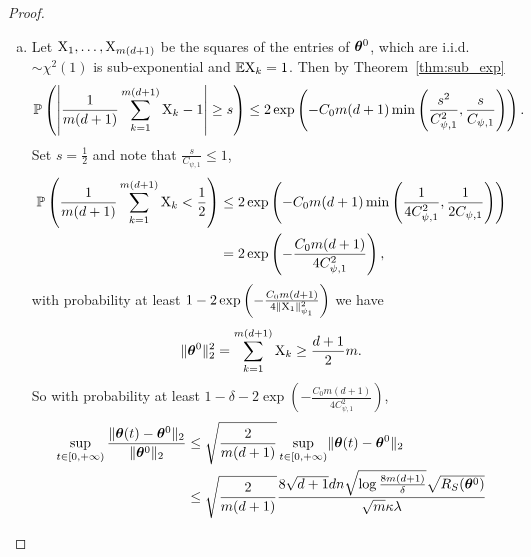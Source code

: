 \documentclass{article}
\begin{document}
\begin{proof}
\begin{enumerate}[(a)]
\begin{enumerate}[(i)]
\begin{equation}
                        \end{equation}
                        Suppose that $t^*_a<+\infty$ then one can take the limit $t\to t^*_a$ in~\eqref{thm-proof:w-step1}. This will lead to a contradiction with the definition of $t^*$. Therefore $t^*_a=+\infty$.
              \end{enumerate}
        \item Let $\textnormal{X}_1, \ldots, \textnormal{X}_{m(d+1)}$ be the squares of the entries of $\bm{\theta}^0$, which are i.i.d. $\sim\chi^2(1)$ is sub-exponential and $\mathbb{E}\textnormal{X}_k=1$. Then by Theorem~\ref{thm:sub_exp}
              \begin{equation}
                  \mathbb{P}\left(\left\lvert\frac{1}{m(d+1)}\sum_{k=1}^{m(d+1)}\textnormal{X}_k-1\right\rvert\geq s\right)\leq 2\exp\left(-C_0 m(d+1) \min\left(\frac{s^2}{C^2_{\psi,1}},\frac{s}{C_{\psi,1}}\right)\right).
              \end{equation}
              Set $s=\frac{1}{2}$ and note that $\frac{s}{C_{\psi,1}}\leq 1$,
              \begin{equation}
                  \begin{aligned}
                      \mathbb{P}\left(\frac{1}{m(d+1)}\sum_{k=1}^{m(d+1)}\textnormal{X}_k<\frac{1}{2}\right)
                       & \leq 2\exp\left(-C_0 m(d+1) \min\left(\frac{1}{4C^2_{\psi,1}},\frac{1}{2C_{\psi,1}}\right)\right) \\
                       & =2\exp\left(-\frac{C_0m(d+1)}{4C^2_{\psi,1}}\right),
                  \end{aligned}
              \end{equation}
              with probability at least $1-2\exp\left(-\frac{C_0m(d+1)}{4\lVert\textnormal{X}_1\rVert^2_{\psi_1}}\right)$ we have
              \begin{equation}
                  \lVert\bm{\theta}^0\rVert^2_2=\sum_{k=1}^{m(d+1)}\textnormal{X}_k\geq\frac{d+1}{2}m.
              \end{equation}
              So with probability at least $1-\delta-2\exp\left(-\frac{C_0m(d+1)}{4C^2_{\psi,1}}\right)$,
              \begin{equation}
                  \begin{aligned}
                      \sup\limits_{t\in[0,+\infty)}\frac{\norm{\vtheta(t)-\vtheta^0}_2}{\norm{\vtheta^0}_2}
                       & \leq \sqrt{\frac{2}{m(d+1)}}\sup\limits_{t\in[0,+\infty)}\norm{\vtheta(t)-\vtheta^0}_2                                          \\
                       & \leq  \sqrt{\frac{2}{m(d+1)}} \frac{8\sqrt{d+1}dn\sqrt{\log\frac{8m(d+1)}{\delta}}\sqrt{\RS(\vtheta^0)}}{\sqrt{m}\kappa\lambda} \\

\end{aligned}
\end{equation}
\end{enumerate}
\end{proof}
\end{document}
